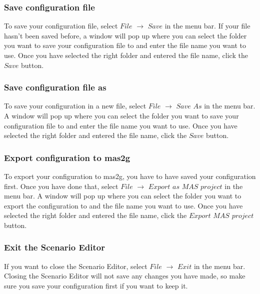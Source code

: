 \subsubsection{Save configuration file}
To save your configuration file, select $File$ $\to$ $Save$ in the menu bar. If your file hasn't been saved before, a window will pop up where you can select the folder you want to save your configuration file to and enter the file name you want to use. Once you have selected the right folder and entered the file name, click the $Save$ button.

\subsubsection{Save configuration file as}
To save your configuration in a new file, select $File$ $\to$ $Save$ $As$ in the menu bar. A window will pop up where you can select the folder you want to save your configuration file to and enter the file name you want to use. Once you have selected the right folder and entered the file name, click the $Save$ button.

\subsubsection{Export configuration to mas2g}
To export your configuration to mas2g, you have to have saved your configuration first. Once you have done that, select $File$ $\to$ $Export$ $as$ $MAS$ $project$ in the menu bar. A window will pop up where you can select the folder you want to export the configuration to and the file name you want to use. Once you have selected the right folder and entered the file name, click the $Export$ $MAS$ $project$ button.

\subsubsection{Exit the Scenario Editor}
If you want to close the Scenario Editor, select $File$ $\to$ $Exit$ in the menu bar. Closing the Scenario Editor will not save any changes you have made, so make sure you save your configuration first if you want to keep it.

